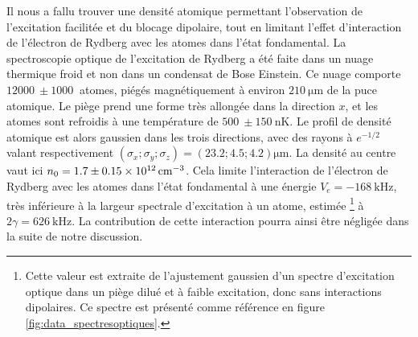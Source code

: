 Il nous a fallu trouver une densité atomique permettant l'observation de l'excitation facilitée et du blocage dipolaire, tout en limitant l'effet d'interaction de l'électron de Rydberg avec les atomes dans l'état fondamental.
La spectroscopie optique de l'excitation de Rydberg a été faite dans un nuage thermique froid et non dans un condensat de Bose Einstein.
Ce nuage comporte $\SI{12000}{} \pm \SI{1000}{}$ atomes, piégés magnétiquement à environ $\SI{210}{\um}$ de la puce atomique.
Le piège prend une forme très allongée dans la direction $x$, et les atomes sont refroidis à une température de $\SI{500}{} \pm \SI{150}{\nano\kelvin}$.
Le profil de densité atomique est alors gaussien dans les trois directions, avec des rayons à $e^{-1/2}$ valant respectivement $(\sigma_x;\sigma_y;\sigma_z) = (\num{23.2} ; \num{4.5} ; \num{4.2})\si{\um}$.
La densité au centre vaut ici $n_0 = \num{1.7}\pm\SI{0.15e12}{\per\raiseto{3}\cm}$.
Cela limite l'interaction de l'électron de Rydberg avec les atomes dans l'état fondamental à une énergie $V_e = -\SI{168}{\kHz}$, très inférieure à la largeur spectrale d'excitation à un atome, estimée \footnote{
Cette valeur est extraite de l'ajustement gaussien d'un spectre d'excitation optique dans un piège dilué et à faible excitation, donc sans interactions dipolaires.
Ce spectre est présenté comme référence en figure \eqref{fig:data_spectresoptiques}.}
à $2\gamma = \SI{626}{\kHz}$.
La contribution de cette interaction pourra ainsi être négligée dans la suite de notre discussion.


